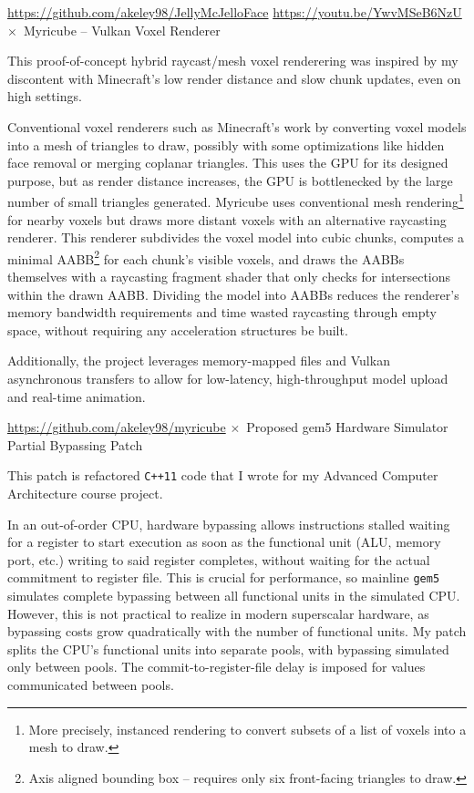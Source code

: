 \documentclass[11pt]{article}
\newcommand{\web}[1]{{ \color{webColor} \small \url{#1}}}
\newcommand{\mySub}[1]{{\color{subColor}\hspace{-6mm} \( \times \)\ \textsf{#1}}}
\newcommand{\lighttt}[1]{{\color{lightttColor}\texttt{#1}}}
\begin{document}
\web{https://github.com/akeley98/JellyMcJelloFace}
\hfill\web{https://youtu.be/YwvMSeB6NzU}
\filbreak
\mySub{Myricube -- Vulkan Voxel Renderer}

This proof-of-concept hybrid raycast/mesh voxel renderering was
inspired by my discontent with Minecraft's low render distance and
slow chunk updates, even on high settings.

Conventional voxel renderers such as Minecraft's work by converting
voxel models into a mesh of triangles to draw, possibly with some
optimizations like hidden face removal or merging coplanar
triangles. This uses the GPU for its designed purpose, but as render
distance increases, the GPU is bottlenecked by the large number of
small triangles generated. Myricube uses conventional mesh
rendering\footnote{More precisely, instanced rendering to convert
subsets of a list of voxels into a mesh to draw.} for nearby voxels
but draws more distant voxels with an alternative raycasting
renderer. This renderer subdivides the voxel model into cubic chunks,
computes a minimal AABB\footnote{Axis aligned bounding box -- requires
only six front-facing triangles to draw.} for each chunk's visible
voxels, and draws the AABBs themselves with a raycasting fragment
shader that only checks for intersections within the drawn AABB.
Dividing the model into AABBs reduces the renderer's memory bandwidth
requirements and time wasted raycasting through empty space, without
requiring any acceleration structures be built.

Additionally, the project leverages memory-mapped files and Vulkan
asynchronous transfers to allow for low-latency, high-throughput model
upload and real-time animation.

\web{https://github.com/akeley98/myricube}
\filbreak
\mySub{Proposed gem5 Hardware Simulator Partial Bypassing Patch}

This patch is refactored \lighttt{C++11} code that I wrote for my
Advanced Computer Architecture course project.

In an out-of-order CPU, hardware bypassing allows instructions stalled
waiting for a register to start execution as soon as the functional
unit (ALU, memory port, etc.) writing to said register completes,
without waiting for the actual commitment to register file. This is
crucial for performance, so mainline \lighttt{gem5} simulates complete
bypassing between all functional units in the simulated CPU. However,
this is not practical to realize in modern superscalar hardware, as
bypassing costs grow quadratically with the number of functional
units. My patch splits the CPU's functional units into separate pools,
with bypassing simulated only between pools. The
commit-to-register-file delay is imposed for values communicated
between pools.
\end{document}
